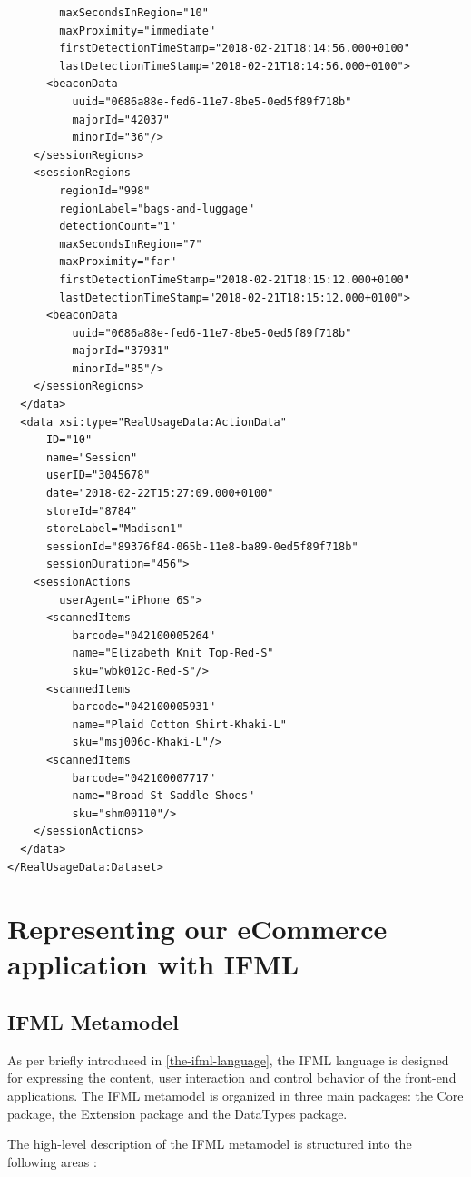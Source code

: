 \begin{lstlisting}
        maxSecondsInRegion="10"
        maxProximity="immediate"
        firstDetectionTimeStamp="2018-02-21T18:14:56.000+0100"
        lastDetectionTimeStamp="2018-02-21T18:14:56.000+0100">
      <beaconData
          uuid="0686a88e-fed6-11e7-8be5-0ed5f89f718b"
          majorId="42037"
          minorId="36"/>
    </sessionRegions>
    <sessionRegions
        regionId="998"
        regionLabel="bags-and-luggage"
        detectionCount="1"
        maxSecondsInRegion="7"
        maxProximity="far"
        firstDetectionTimeStamp="2018-02-21T18:15:12.000+0100"
        lastDetectionTimeStamp="2018-02-21T18:15:12.000+0100">
      <beaconData
          uuid="0686a88e-fed6-11e7-8be5-0ed5f89f718b"
          majorId="37931"
          minorId="85"/>
    </sessionRegions>
  </data>
  <data xsi:type="RealUsageData:ActionData"
      ID="10"
      name="Session"
      userID="3045678"
      date="2018-02-22T15:27:09.000+0100"
      storeId="8784"
      storeLabel="Madison1"
      sessionId="89376f84-065b-11e8-ba89-0ed5f89f718b"
      sessionDuration="456">
    <sessionActions
        userAgent="iPhone 6S">
      <scannedItems
          barcode="042100005264"
          name="Elizabeth Knit Top-Red-S"
          sku="wbk012c-Red-S"/>
      <scannedItems
          barcode="042100005931"
          name="Plaid Cotton Shirt-Khaki-L"
          sku="msj006c-Khaki-L"/>
      <scannedItems
          barcode="042100007717"
          name="Broad St Saddle Shoes"
          sku="shm00110"/>
    </sessionActions>
  </data>
</RealUsageData:Dataset>
\end{lstlisting}

\section{Representing our eCommerce application with IFML}

\subsection{IFML Metamodel}

As per briefly introduced in \ref{the-ifml-language}, the IFML language is designed for expressing the content, user interaction and control behavior of the front-end applications. The IFML metamodel is organized in three main packages: the Core package, the Extension package and the DataTypes
package. 

The high-level description of the IFML metamodel  is structured into the following areas :


